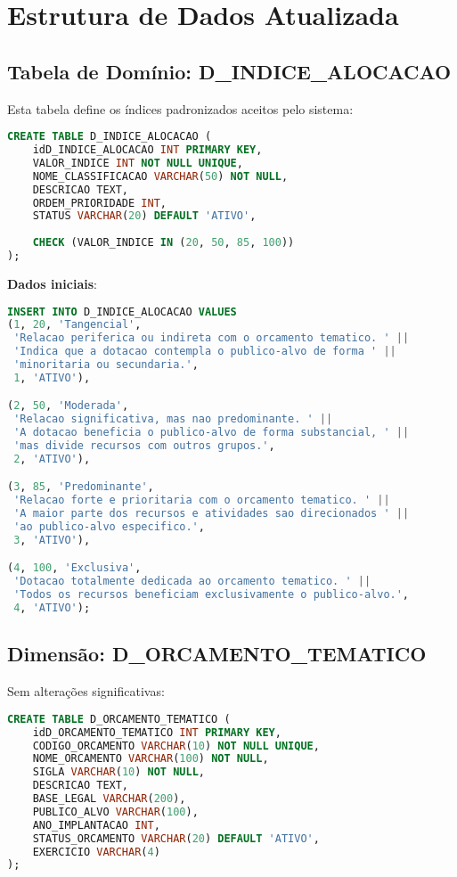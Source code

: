 \documentclass[12pt,a4paper]{article}
\begin{document}
\section{Estrutura de Dados Atualizada}

\subsection{Tabela de Domínio: D\_INDICE\_ALOCACAO}

Esta tabela define os índices padronizados aceitos pelo sistema:

\begin{lstlisting}[language=SQL, basicstyle=\small\ttfamily]
CREATE TABLE D_INDICE_ALOCACAO (
    idD_INDICE_ALOCACAO INT PRIMARY KEY,
    VALOR_INDICE INT NOT NULL UNIQUE,
    NOME_CLASSIFICACAO VARCHAR(50) NOT NULL,
    DESCRICAO TEXT,
    ORDEM_PRIORIDADE INT,
    STATUS VARCHAR(20) DEFAULT 'ATIVO',
    
    CHECK (VALOR_INDICE IN (20, 50, 85, 100))
);
\end{lstlisting}

\textbf{Dados iniciais}:
\begin{lstlisting}[language=SQL, basicstyle=\small\ttfamily]
INSERT INTO D_INDICE_ALOCACAO VALUES
(1, 20, 'Tangencial', 
 'Relacao periferica ou indireta com o orcamento tematico. ' ||
 'Indica que a dotacao contempla o publico-alvo de forma ' ||
 'minoritaria ou secundaria.', 
 1, 'ATIVO'),

(2, 50, 'Moderada', 
 'Relacao significativa, mas nao predominante. ' ||
 'A dotacao beneficia o publico-alvo de forma substancial, ' ||
 'mas divide recursos com outros grupos.', 
 2, 'ATIVO'),

(3, 85, 'Predominante', 
 'Relacao forte e prioritaria com o orcamento tematico. ' ||
 'A maior parte dos recursos e atividades sao direcionados ' ||
 'ao publico-alvo especifico.', 
 3, 'ATIVO'),

(4, 100, 'Exclusiva', 
 'Dotacao totalmente dedicada ao orcamento tematico. ' ||
 'Todos os recursos beneficiam exclusivamente o publico-alvo.', 
 4, 'ATIVO');
\end{lstlisting}

\subsection{Dimensão: D\_ORCAMENTO\_TEMATICO}

Sem alterações significativas:

\begin{lstlisting}[language=SQL, basicstyle=\small\ttfamily]
CREATE TABLE D_ORCAMENTO_TEMATICO (
    idD_ORCAMENTO_TEMATICO INT PRIMARY KEY,
    CODIGO_ORCAMENTO VARCHAR(10) NOT NULL UNIQUE,
    NOME_ORCAMENTO VARCHAR(100) NOT NULL,
    SIGLA VARCHAR(10) NOT NULL,
    DESCRICAO TEXT,
    BASE_LEGAL VARCHAR(200),
    PUBLICO_ALVO VARCHAR(100),
    ANO_IMPLANTACAO INT,
    STATUS_ORCAMENTO VARCHAR(20) DEFAULT 'ATIVO',
    EXERCICIO VARCHAR(4)
);
\end{lstlisting}
\end{document}
